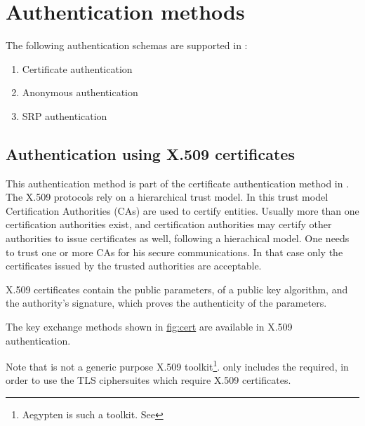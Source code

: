 \section{Authentication methods}
\par
The following authentication schemas are supported in \gnutls:
\begin{enumerate}
 \item Certificate authentication
 \item Anonymous authentication
 \item SRP authentication
\end{enumerate}

\subsection{Authentication using X.509 certificates}
This authentication method is part of the certificate authentication
method in \gnutls{}.
The X.509 protocols rely on a hierarchical trust model. In this trust model
Certification Authorities (CAs) are used to certify entities.
Usually more than one certification authorities exist, and certification
authorities may certify other authorities to issue certificates as well,
following a hierachical model. 
One needs to trust one or more CAs for his secure
communications. In that case only the certificates issued by the trusted
authorities are acceptable. 
\par
X.509 certificates contain the public parameters, 
of a public key algorithm, and the authority's signature, which proves the
authenticity of the parameters.
\par
The key exchange methods shown in \hyperref{figure}{figure }{}{fig:cert} are
available in X.509 authentication. 

\par
Note that \gnutls{} is not a generic purpose X.509 toolkit\footnote{Aegypten is such a toolkit. See 
}. 
\gnutls{} only includes the required,
in order to use the TLS ciphersuites which require X.509 certificates.

